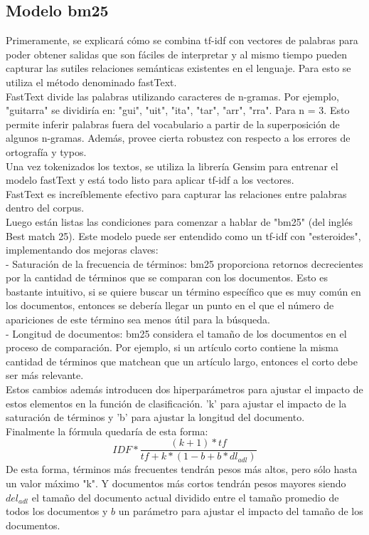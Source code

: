 \documentclass[runningheads,a4paper]{llncs}
\begin{document}
\subsection*{Modelo bm25}
Primeramente, se explicará cómo se combina tf-idf con vectores de palabras para poder obtener salidas que son fáciles de interpretar y al mismo tiempo pueden capturar las sutiles relaciones semánticas existentes en el lenguaje. Para esto se utiliza el método denominado fastText.\\
FastText divide las palabras utilizando caracteres de n-gramas. Por ejemplo, "guitarra" se dividiría en: "gui", "uit", "ita", "tar", "arr", "rra". Para n = 3. Esto permite inferir palabras fuera del vocabulario a partir de la superposición de algunos n-gramas. Además, provee cierta robustez con respecto a los errores de ortografía y typos.\\
Una vez tokenizados los textos, se utiliza la librería Gensim para entrenar el modelo fastText y está todo listo para aplicar tf-idf a los vectores.\\
FastText es increíblemente efectivo para capturar las relaciones entre palabras dentro del corpus.\\

Luego están listas las condiciones para comenzar a hablar de "bm25" (del inglés Best match 25). Este modelo puede ser entendido como un tf-idf con "esteroides", implementando dos mejoras claves: \\
- Saturación de la frecuencia de términos: bm25 proporciona retornos decrecientes por la cantidad de términos que se comparan con los documentos. Esto es bastante intuitivo, si se quiere buscar un término específico que es muy común en los documentos, entonces se debería llegar un punto en el que el número de apariciones de este término sea menos útil para la búsqueda.\\
- Longitud de documentos: bm25 considera el tamaño de los documentos en el proceso de comparación. Por ejemplo, si un artículo corto contiene la misma cantidad de términos que matchean que un artículo largo, entonces el corto debe ser más relevante.\\
Estos cambios además introducen dos hiperparámetros para ajustar el impacto de estos elementos en la función de clasificación. 'k' para ajustar el impacto de la saturación de términos y 'b' para ajustar la longitud del documento.\\
Finalmente la fórmula quedaría de esta forma:\\
$$
IDF * \frac{(k+1)*tf}{tf+k * (1-b + b*dl_{adl})}
$$
De esta forma, términos más frecuentes tendrán pesos más altos, pero sólo hasta un valor máximo "k". Y documentos más cortos tendrán pesos mayores siendo $del_{adl}$ el tamaño del documento actual dividido entre el tamaño promedio de todos los documentos y $b$ un parámetro para ajustar el impacto del tamaño de los documentos.\\
\end{document}

